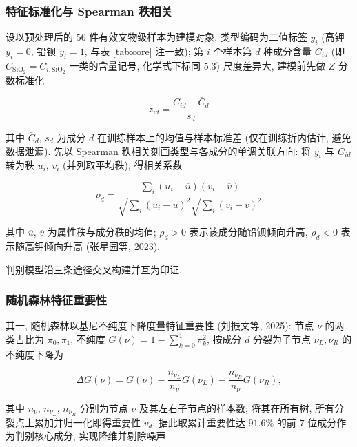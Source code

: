 \documentclass{ctexart}
\begin{document}
\subsubsection{特征标准化与 Spearman 秩相关}

设以预处理后的 $56$ 件有效文物级样本为建模对象, 类型编码为二值标签 $y_i$ (高钾 $y_i=0$, 铅钡 $y_i=1$, 与表 \ref{tab:core} 注一致); 第 $i$ 个样本第 $d$ 种成分含量 $C_{id}$ (即 $C_{\mathrm{SiO_2}}=C_{i,\mathrm{SiO_2}}$ 一类的含量记号, 化学式下标同 5.3) 尺度差异大, 建模前先做 $Z$ 分数标准化

\begin{equation*}
z_{id}=\frac{C_{id}-\overline{C}_{d}}{s_{d}}
\end{equation*}

其中 $\overline{C}_d$, $s_d$ 为成分 $d$ 在训练样本上的均值与样本标准差 (仅在训练折内估计, 避免数据泄漏). 先以 Spearman 秩相关刻画类型与各成分的单调关联方向: 将 $y_i$ 与 $C_{id}$ 转为秩 $u_i$, $v_i$ (并列取平均秩), 得相关系数

\begin{equation*}
\rho_{d}=\frac{\sum_{i}\left(u_{i}-\overline{u}\right)\left(v_{i}-\overline{v}\right)}{\sqrt{\sum_{i}\left(u_{i}-\overline{u}\right)^{2}}\sqrt{\sum_{i}\left(v_{i}-\overline{v}\right)^{2}}}
\end{equation*}

其中 $\overline{u}$, $\overline{v}$ 为属性秩与成分秩的均值; $\rho_{d}>0$ 表示该成分随铅钡倾向升高, $\rho_{d}<0$ 表示随高钾倾向升高 (张星园等, 2023).

判别模型沿三条途径交叉构建并互为印证.

\subsubsection{随机森林特征重要性}

其一, 随机森林以基尼不纯度下降度量特征重要性 (刘振文等, 2025): 节点 $\nu$ 的两类占比为 $\pi_0,\pi_1$, 不纯度 $G\left(\nu\right)=1-\sum_{k=0}^{1}\pi_k^2$, 按成分 $d$ 分裂为子节点 $\nu_L,\nu_R$ 的不纯度下降为

\begin{equation*}
\Delta{G}\left(\nu\right)=G\left(\nu\right)-\frac{n_{\nu_L}}{n_\nu}G\left(\nu_L\right)-\frac{n_{\nu_R}}{n_\nu}G\left(\nu_R\right),
\end{equation*}

其中 $n_\nu$, $n_{\nu_L}$, $n_{\nu_R}$ 分别为节点 $\nu$ 及其左右子节点的样本数; 将其在所有树, 所有分裂点上累加并归一化即得重要性 $v_d$, 据此取累计重要性达 $91.6\%$ 的前 $7$ 位成分作为判别核心成分, 实现降维并剔除噪声.
\end{document}
